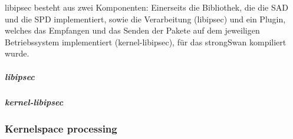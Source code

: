 libipsec besteht aus zwei Komponenten: Einerseits die Bibliothek, die die SAD und die SPD
implementiert, sowie die Verarbeitung (libipsec) und ein Plugin, welches das Empfangen und das Senden
der Pakete auf dem jeweiligen Betriebssystem implementiert (kernel-libipsec), für das strongSwan kompiliert wurde.

\subparagraph{libipsec}
\subparagraph{kernel-libipsec}

\subsubsection{Kernelspace processing}

